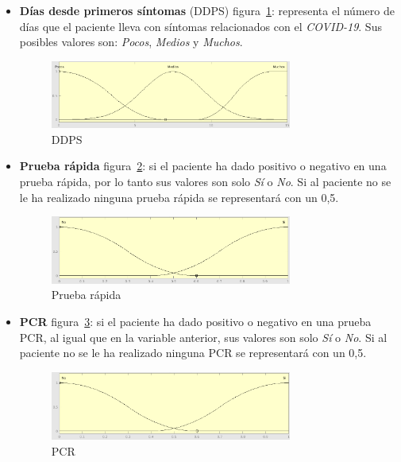 \documentclass[12pt,a4paper, xcolor=table]{article}
\begin{document}
\begin{itemize}
  \item \textbf{Días desde primeros síntomas} (DDPS) figura~\ref{DDPS}: representa el número de días que el paciente lleva con síntomas relacionados con el \textit{COVID-19}. Sus posibles valores son: \textit{Pocos}, \textit{Medios} y \textit{Muchos}.

  \begin{figure}[!h]
      \centering
      \includegraphics[width=300px]{img/dias_primeros_sintomas.png}
      \caption{DDPS}
      \label{DDPS}
  \end{figure}

  \item \textbf{Prueba rápida} figura~\ref{PR}: si el paciente ha dado positivo o negativo en una prueba rápida, por lo tanto sus valores son solo \textit{Sí} o \textit{No}. Si al paciente no se le ha realizado ninguna prueba rápida se representará con un 0,5.

  \begin{figure}[!h]
      \centering
      \includegraphics[width=300px]{img/prueba_rapida.png}
      \caption{Prueba rápida}
      \label{PR}
  \end{figure}

  \item \textbf{PCR} figura~\ref{PCR}: si el paciente ha dado positivo o negativo en una prueba PCR, al igual que en la variable anterior, sus valores son solo \textit{Sí} o \textit{No}. Si al paciente no se le ha realizado ninguna PCR se representará con un 0,5.

  \begin{figure}[!h]
      \centering
      \includegraphics[width=300px]{img/PCR.png}
      \caption{PCR}
      \label{PCR}
  \end{figure}


\end{itemize}
\end{document}
